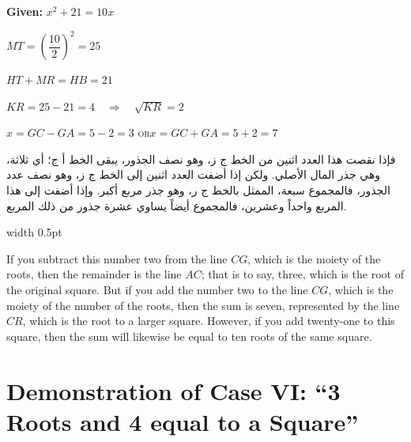\documentclass[10pt,a4paper]{book}
\newlength{\colwidth}
\newcommand{\bilingualpair}[2]{%
  \noindent
  \begin{minipage}[t]{\colwidth}
  \begin{flushright}
  \vspace{0pt}
  {\arabicfont\small #1}
  \end{flushright}
  \end{minipage}%
  \hfill\textcolor{columnsepclr}{\vrule width 0.5pt}\hfill
  \begin{minipage}[t]{\colwidth}
  \vspace{0pt}
  {\small #2}
  \end{minipage}%
  \par\vspace{0.6em}
}
\begin{document}
\vspace{0.5em}
\begin{mathbox}[title={\textbf{Geometric Proof of Case V}}]
\begin{center}
\textbf{Given:} $x^2 + 21 = 10x$

\vspace{0.3cm}

$MT = \left(\dfrac{10}{2}\right)^2 = 25$

$HT + MR = HB = 21$

$KR = 25 - 21 = 4 \quad\Rightarrow\quad \sqrt{KR} = 2$

\vspace{0.3cm}

$x = GC - GA = 5 - 2 = 3$ \quad\textsc{or}\quad $x = GC + GA = 5 + 2 = 7$
\end{center}
\end{mathbox}
\vspace{0.5em}

\bilingualpair{
فإذا نقصت هذا العدد اثنين من الخط ج ز، وهو نصف الجذور،
يبقى الخط أ ج؛ أي ثلاثة، وهي جذر المال الأصلي. ولكن إذا
أضفت العدد اثنين إلى الخط ج ز، وهو نصف عدد الجذور، فالمجموع
سبعة، الممثل بالخط ج ر، وهو جذر مربع أكبر. وإذا أضفت
إلى هذا المربع واحداً وعشرين، فالمجموع أيضاً يساوي عشرة
جذور من ذلك المربع.
}{
If you subtract this number two from the line $CG$, which is the moiety of
the roots, then the remainder is the line $AC$; that is to say, three, which
is the root of the original square. But if you add the number two to the
line $CG$, which is the moiety of the number of the roots, then the sum is
seven, represented by the line $CR$, which is the root to a larger square.
However, if you add twenty-one to this square, then the sum will likewise be
equal to ten roots of the same square.
}

\section{Demonstration of Case VI: ``3 Roots and 4 equal to a Square''}
\end{document}
